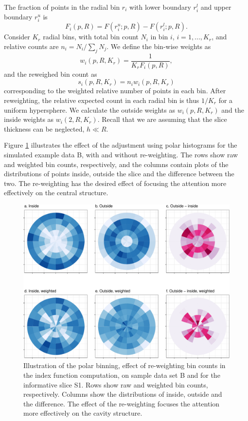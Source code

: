 \documentclass[]{interact}
\theoremstyle{plain}%
\theoremstyle{definition}
\theoremstyle{remark}
\begin{document}
The fraction of points in the radial bin \(r_i\) with lower boundary
\(r_i^l\) and upper boundary \(r_i^u\) is \begin{equation}
F_{i}(p, R) = F(r_i^u; p, R) - F(r_i^l; p, R).
\label{eq:frac}
\end{equation} Consider \(K_r\) radial bins, with total bin count
\(N_i\) in bin \(i\), \(i = 1,...,K_r\), and relative counts are
\(n_i = N_i / \sum_j N_j\). We define the bin-wise weights as
\begin{equation}
w_i(p, R, K_r) = \frac{1}{K_r F_i(p,R)},
\end{equation} and the reweighed bin count as \begin{equation}
s_i(p, R, K_r) = n_i w_i(p, R, K_r)
\label{eq:reweight}
\end{equation} corresponding to the weighted relative number of points
in each bin. After reweighting, the relative expected count in each
radial bin is thus \(1/K_r\) for a uniform hypersphere. We calculate the
outside weights as \(w_i(p, R, K_r)\) and the inside weights as
\(w_i(2, R, K_r)\). Recall that we are assuming that the slice thickness
can be neglected, \(h\ll R\).

Figure \ref{fig:data_and_densities} illustrates the effect of the
adjustment using polar histograms for the simulated example data B, with
and without re-weighting. The rows show raw and weighted bin counts,
respectively, and the columns contain plots of the distributions of
points inside, outside the slice and the difference between the two. The
re-weighting has the desired effect of focusing the attention more
effectively on the central structure.

\begin{figure}

{\centering \includegraphics[width=0.9\linewidth]{section_pursuit_files/figure-latex/data_and_densities-1} 

}

\caption{Illustration of the polar binning, effect of re-weighting bin counts in the index function computation, on sample data set B and for the informative slice S1. Rows show raw and weighted bin counts, respectively. Columns show the distributions of inside, outside and the difference. The effect of the re-weighting focuses the attention more effectively on the cavity structure.}\label{fig:data_and_densities}
\end{figure}
\end{document}
